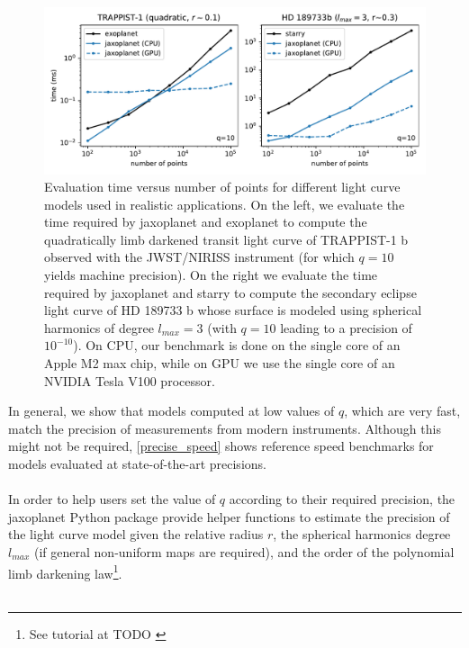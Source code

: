 \documentclass[modern]{aastex631}
\begin{document}
\begin{figure}[H]
    \begin{center}
        \includegraphics[width=\textwidth]{../workflows/figures/speed_vs_N_realistic.pdf}
        \caption{Evaluation time versus number of points for different light curve models used in realistic applications. On the left, we evaluate the time required by \textsf{jaxoplanet} and \textsf{exoplanet} to compute the quadratically limb darkened transit light curve of TRAPPIST-1 b observed with the JWST/NIRISS instrument (for which $q=10$ yields machine precision). On the right we evaluate the time required by \textsf{jaxoplanet} and \textsf{starry} to compute the secondary eclipse light curve of HD 189733 b whose surface is modeled using spherical harmonics of degree $l_{max}=3$ (with $q=10$ leading to a precision of $10^{-10}$). On CPU, our benchmark is done on the single core of an Apple M2 max chip, while on GPU we use the single core of an NVIDIA Tesla V100 processor. }
        \label{fig:real_benchmark}
    \end{center}
\end{figure}

In general, we show that models computed at low values of $q$, which are very fast, match the precision of measurements from modern instruments. Although this might not be required, \autoref{precise_speed} shows reference speed benchmarks for models evaluated at state-of-the-art precisions.\\\\
In order to help users set the value of $q$ according to their required precision, the \textsf{jaxoplanet} Python package provide helper functions to estimate the precision of the light curve model given the relative radius $r$, the spherical harmonics degree $l_{max}$ (if general non-uniform maps are required), and the order of the polynomial limb darkening law\footnote{See tutorial at TODO \href{}{}}.\\\\
\end{document}
